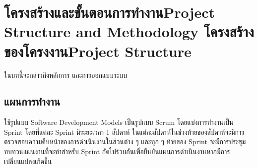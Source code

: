 \chapter{\ifproject%
\ifcpe โครงสร้างและขั้นตอนการทำงาน\else Project Structure and Methodology\fi
\else%
\ifcpe โครงสร้างของโครงงาน\else Project Structure\fi
\fi
}

ในบทนี้จะกล่าวถึงหลักการ และการออกแบบระบบ

\makeatletter


\makeatother

\section{แผนการทำงาน}
\quad ใช้รูปแบบ Software Development Models เป็นรูปแบบ Scrum โดยแบ่งการทำงานเป็น Sprint  โดยที่แต่ละ Sprint มีระยะเวลา 1 สัปดาห์ ในแต่ละสัปดาห์ในช่วงท้ายของสัปดาห์จะมีการตรวจสอบความคืบหน้าของการดำเนินงานในส่วนต่าง ๆ และทุก ๆ ท้ายของ Sprint จะมีการประชุมทบทวนแผนงานที่จะทำสำหรับ Sprint ถัดไปร่วมกันเพื่อยืนยันแผนการดำเนินงานหากมีการเปลี่ยนแปลงเกิดขึ้น 
